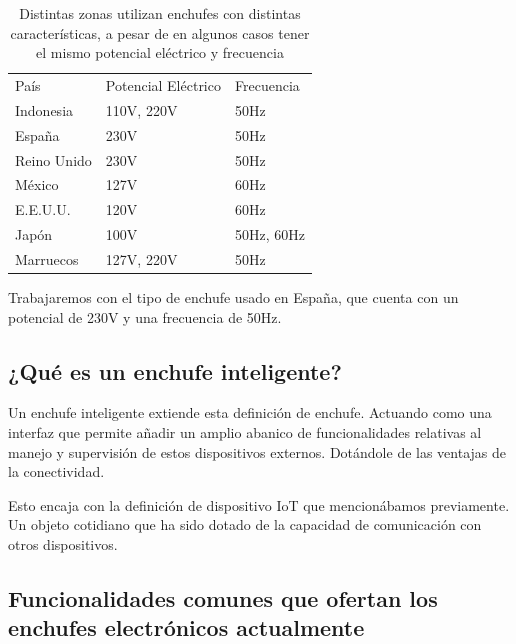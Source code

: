 \documentclass[a4paper,10pt]{article}
\begin{document}
\begin{table}[H]
  \centering
  \begin{tabular}{lll}
    \rowcolor[HTML]{DAE8FC} 
    País      & Potencial  Eléctrico & Frecuencia \\
    Indonesia & 110V, 220V           & 50Hz       \\
    \rowcolor[HTML]{F8FF00} 
    España    & 230V                 & 50Hz       \\
    Reino Unido & 230V               & 50Hz       \\
    México    & 127V                 & 60Hz       \\
    E.E.U.U.  & 120V                 & 60Hz       \\
    Japón     & 100V                 & 50Hz, 60Hz \\
    Marruecos & 127V, 220V           & 50Hz      
  \end{tabular}
  \caption{Distintas zonas utilizan enchufes con distintas
    características, a pesar de en algunos casos tener el mismo
    potencial eléctrico y frecuencia}\label{table:enchufes-paises}
\end{table}

Trabajaremos con el tipo de enchufe usado en España, que cuenta con un
potencial de 230V y una frecuencia de 50Hz\cite{IECWorldPlugs}.

\newpage

\subsection{¿Qué es un enchufe
inteligente?}\label{que-es-un-enchufe-inteligente}

Un enchufe inteligente extiende esta definición de enchufe. Actuando
como una interfaz que permite añadir un amplio abanico de
funcionalidades relativas al manejo y supervisión de estos dispositivos
externos. Dotándole de las ventajas de la conectividad.

Esto encaja con la definición de dispositivo IoT que mencionábamos
previamente. Un objeto cotidiano que ha sido dotado de la capacidad de
comunicación con otros dispositivos.

\subsection{Funcionalidades comunes que ofertan los enchufes
electrónicos
actualmente}\label{funcionalidades-comunes-que-ofertan-los-enchufes-electruxf3nicos-actualmente}
\end{document}
